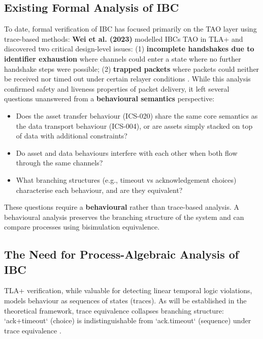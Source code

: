 \subsection{Existing Formal Analysis of
IBC}\label{existing-formal-analysis-of-ibc}

To date, formal verification of IBC has focused primarily on the TAO
layer using trace-based methods: \textbf{Wei et al. (2023)} modelled
IBC\textquotesingle s TAO in TLA+ and discovered two critical
design-level issues: (1) \textbf{incomplete handshakes due to identifier
exhaustion} where channels could enter a state where no further
handshake steps were possible; (2) \textbf{trapped packets} where
packets could neither be received nor timed out under certain relayer
conditions \citep{Wei_2023}. While this analysis confirmed safety and
liveness properties of packet delivery, it left several questions
unanswered from a \textbf{behavioural semantics} perspective:

\begin{itemize}
\tightlist
\item
  Does the asset transfer behaviour (ICS-020) share the same core
  semantics as the data transport behaviour (ICS-004), or are assets
  simply stacked on top of data with additional constraints?
\item
  Do asset and data behaviours interfere with each other when both flow
  through the same channels?
\item
  What branching structures (e.g., timeout vs acknowledgement choices)
  characterise each behaviour, and are they equivalent?
\end{itemize}

These questions require a \textbf{behavioural} rather than trace-based
analysis. A behavioural analysis preserves the branching structure of
the system and can compare processes using bisimulation equivalence.

\subsection{The Need for Process-Algebraic Analysis of
IBC}\label{the-need-for-process-algebraic-analysis-of-ibc}

TLA+ verification, while valuable for detecting linear temporal logic
violations, models behaviour as sequences of states (traces). As will be
established in the theoretical framework, trace equivalence collapses
branching structure: `ack+timeout` (choice) is indistinguishable from
`ack.timeout` (sequence) under trace equivalence \citep{Fokkink2004}.

